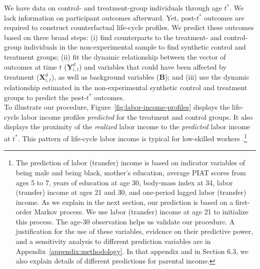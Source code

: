 \noindent We have data on control- and treatment-group individuals through age $t^{\ast}$. We lack information on participant outcomes afterward. Yet, post-$t^{\ast}$ outcomes are required to construct counterfactual life-cycle profiles. We predict these outcomes based on three broad steps: (i) find counterparts to the treatment- and control-group individuals in the non-experimental sample to find synthetic control and treatment groups; (ii) fit the dynamic relationship between the vector of outcomes at time $t$ ($\bm{Y}^{d}_{i,t}$) and variables that could have been affected by treatment ($\bm{X}^{d}_{i,t}$), as well as background variables ($\bm{B}$); and (iii) use the dynamic relationship estimated in the non-experimental synthetic control and treatment groups to predict the post-$t^{\ast}$ outcomes.\\ 

\noindent To illustrate our procedure, Figure~\ref{fig:labor-income-profiles} displays the life-cycle labor income profiles \textit{predicted} for the treatment and control groups. It also displays the proximity of the \textit{realized} labor income to the \textit{predicted} labor income at $t^*$. This pattern of life-cycle labor income is typical for low-skilled workers \citep{Blundell-etal_2015_J-Pub-E,Gladden_Taber_2000_WageProgression,Sanders-Taber_2012_AR,Lagakos_Moll_etal_2016_LifeCycle_NBER}.\footnote{The prediction of labor (transfer) income is based on indicator variables of being male and being black, mother's education, average PIAT scores from ages 5 to 7, years of education at age 30, body-mass index at 34, labor (transfer) income at ages 21 and 30, and one-period lagged labor (transfer) income. As we explain in the next section, our prediction is based on a first-order Markov process. We use labor (transfer) income at age 21 to initialize this process. The age-30 observation helps us validate our procedure. A justification for the use of these variables, evidence on their predictive power, and a sensitivity analysis to different prediction variables are in Appendix~\ref{appendix:methodology}. In that appendix and in Section 6.3, we also explain details of different predictions for parental income.}\\

